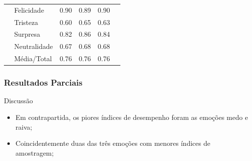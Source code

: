 \documentclass{beamer}
\begin{document}
\begin{frame}
\begin{table}[]
\begin{tabular}{llcccc}
                                    & Felicidade   & 0.90     & 0.89      & 0.90     &                                 \\
                                    & Tristeza     & 0.60     & 0.65      & 0.63     &                                 \\
                                    & Surpresa     & 0.82     & 0.86      & 0.84     &                                 \\
                                    & Neutralidade & 0.67     & 0.68      & 0.68     &                                 \\
                                    & Média/Total  & 0.76     & 0.76      & 0.76     &                                 \\ \hline
\end{tabular}
\end{table} 
\end{frame}


\begin{frame}
\frametitle{Resultados Parciais}
 \begin{block}{Discussão}
\begin{itemize}
\item Em contrapartida, os piores índices de desempenho foram as emoções medo e raiva;
\pause
\item Coincidentemente duas das três emoções com menores índices de amostragem;
\end{itemize}
\end{block}
\end{frame}
\end{document}

